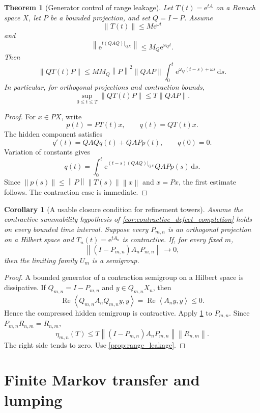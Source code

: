 \documentclass{aomart}
\newtheorem{theorem}{Theorem}[section]
\newtheorem{corollary}[corollary]{Corollary}
\theoremstyle{definition}
\theoremstyle{remark}
\newcommand{\e}{\mathrm e}
\newcommand{\dd}{\,\mathrm d}
\newcommand{\norm}[1]{\left\lVert#1\right\rVert}
\newcommand{\ip}[2]{\left\langle#1,#2\right\rangle}
\begin{document}
\begin{theorem}[Generator control of range leakage]\label{thm:generator_range_leakage}
Let \(T(t)=\e^{tA}\) on a Banach space \(X\), let \(P\) be a bounded projection, and set \(Q=I-P\). Assume
\[
\norm{T(t)}\leq M\e^{\omega t}
\]
and
\[
\norm{\e^{t(QAQ)|_{QX}}}
\leq M_Q\e^{\omega_Qt}.
\]
Then
\[
\norm{QT(t)P}
\leq
M M_Q\norm P^2\norm{QAP}
\int_0^t
\e^{\omega_Q(t-s)+\omega s}
\dd s.
\]
In particular, for orthogonal projections and contraction bounds,
\[
\sup_{0\leq t\leq T}
\norm{QT(t)P}
\leq
T\norm{QAP}.
\]
\end{theorem}

\begin{proof}
For \(x\in PX\), write
\[
p(t)=PT(t)x,
\qquad
q(t)=QT(t)x.
\]
The hidden component satisfies
\[
q'(t)=QAQq(t)+QAPp(t),
\qquad
q(0)=0.
\]
Variation of constants gives
\[
q(t)=
\int_0^t
\e^{(t-s)(QAQ)|_{QX}}
QAPp(s)
\dd s.
\]
Since
\(
\norm{p(s)}\leq\norm P\norm{T(s)}\norm x
\)
and \(x=Px\), the first estimate follows. The contraction case is immediate.
\end{proof}

\begin{corollary}[A usable closure condition for refinement towers]\label{cor:generator_closure_tower}
Assume the contractive summability hypothesis of \cref{cor:contractive_defect_completion} holds on every bounded time interval. Suppose every \(P_{m,n}\) is an orthogonal projection on a Hilbert space and \(T_n(t)=\e^{tA_n}\) is contractive. If, for every fixed \(m\),
\[
\norm{(I-P_{m,n})A_nP_{m,n}}
\longrightarrow0,
\]
then the limiting family \(U_m\) is a semigroup.
\end{corollary}

\begin{proof}
A bounded generator of a contraction semigroup on a Hilbert space is dissipative. If \(Q_{m,n}=I-P_{m,n}\) and \(y\in Q_{m,n}X_n\), then
\[
\operatorname{Re}\ip{Q_{m,n}A_nQ_{m,n}y}{y}
=
\operatorname{Re}\ip{A_ny}{y}
\leq0.
\]
Hence the compressed hidden semigroup is contractive. Apply \cref{thm:generator_range_leakage} to \(P_{m,n}\). Since \(P_{m,n}R_{n,m}=R_{n,m}\),
\[
\eta_{m,n}(T)
\leq
T\norm{(I-P_{m,n})A_nP_{m,n}}
\norm{R_{n,m}}.
\]
The right side tends to zero. Use \cref{prop:range_leakage}.
\end{proof}

\section{Finite Markov transfer and lumping}\label{sec:markov}
\end{document}
